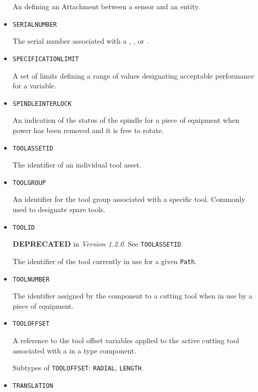 \begin{itemize}
An  defining an \gls{Attachment} between a sensor and an entity.


\item \texttt{SERIAL\textunderscore NUMBER}  

The serial number associated with a , , or .


\item \texttt{SPECIFICATION\textunderscore LIMIT}  

A set of limits defining a range of values designating acceptable performance for a variable.


\item \texttt{SPINDLE\textunderscore INTERLOCK}  

An indication of the status of the spindle for a piece of equipment when power has been removed and it is free to rotate.


\item \texttt{TOOL\textunderscore ASSET\textunderscore ID}  

The identifier of an individual tool asset.


\item \texttt{TOOL\textunderscore GROUP}  

An identifier for the tool group associated with a specific tool. Commonly used to designate spare tools.


\item \texttt{TOOL\textunderscore ID}  

\textbf{DEPRECATED} in \textit{Version 1.2.0}.   See \texttt{TOOL\textunderscore ASSET\textunderscore ID}.

The identifier of the tool currently in use for a given \texttt{Path}.


\item \texttt{TOOL\textunderscore NUMBER}  

The identifier assigned by the  component to a cutting tool when in use by a piece of equipment.


\item \texttt{TOOL\textunderscore OFFSET}  

A reference to the tool offset variables applied to the active cutting tool associated with a  in a  type component.

Subtypes of \texttt{TOOL\textunderscore OFFSET}: \texttt{RADIAL}, \texttt{LENGTH}.

\item \texttt{TRANSLATION}  


\end{itemize}
